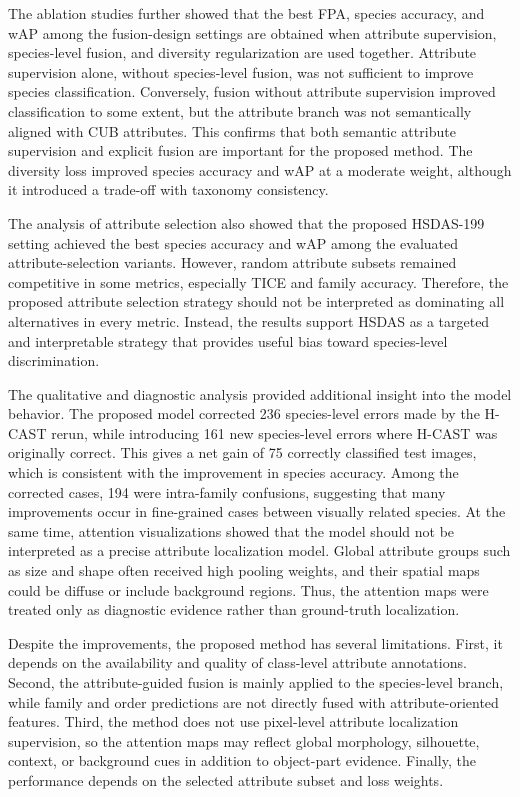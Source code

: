 The ablation studies further showed that the best FPA, species accuracy, and wAP among the fusion-design settings are obtained when attribute supervision, species-level fusion, and diversity regularization are used together. Attribute supervision alone, without species-level fusion, was not sufficient to improve species classification. Conversely, fusion without attribute supervision improved classification to some extent, but the attribute branch was not semantically aligned with CUB attributes. This confirms that both semantic attribute supervision and explicit fusion are important for the proposed method. The diversity loss improved species accuracy and wAP at a moderate weight, although it introduced a trade-off with taxonomy consistency.

The analysis of attribute selection also showed that the proposed HSDAS-199 setting achieved the best species accuracy and wAP among the evaluated attribute-selection variants. However, random attribute subsets remained competitive in some metrics, especially TICE and family accuracy. Therefore, the proposed attribute selection strategy should not be interpreted as dominating all alternatives in every metric. Instead, the results support HSDAS as a targeted and interpretable strategy that provides useful bias toward species-level discrimination.

The qualitative and diagnostic analysis provided additional insight into the model behavior. The proposed model corrected 236 species-level errors made by the H-CAST rerun, while introducing 161 new species-level errors where H-CAST was originally correct. This gives a net gain of 75 correctly classified test images, which is consistent with the improvement in species accuracy. Among the corrected cases, 194 were intra-family confusions, suggesting that many improvements occur in fine-grained cases between visually related species. At the same time, attention visualizations showed that the model should not be interpreted as a precise attribute localization model. Global attribute groups such as size and shape often received high pooling weights, and their spatial maps could be diffuse or include background regions. Thus, the attention maps were treated only as diagnostic evidence rather than ground-truth localization.

Despite the improvements, the proposed method has several limitations. First, it depends on the availability and quality of class-level attribute annotations. Second, the attribute-guided fusion is mainly applied to the species-level branch, while family and order predictions are not directly fused with attribute-oriented features. Third, the method does not use pixel-level attribute localization supervision, so the attention maps may reflect global morphology, silhouette, context, or background cues in addition to object-part evidence. Finally, the performance depends on the selected attribute subset and loss weights.

